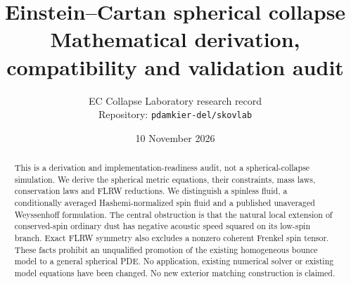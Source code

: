 \documentclass[11pt,a4paper]{article}
\title{Einstein--Cartan spherical collapse\\Mathematical derivation, compatibility and validation audit}
\author{EC Collapse Laboratory research record\\\small Repository: \texttt{pdamkier-del/skovlab}}
\date{10 November 2026}
\begin{document}
\maketitle
\begin{abstract}
This is a derivation and implementation-readiness audit, not a spherical-collapse simulation. We derive the spherical metric equations, their constraints, mass laws, conservation laws and FLRW reductions. We distinguish a spinless fluid, a conditionally averaged Hashemi-normalized spin fluid and a published unaveraged Weyssenhoff formulation. The central obstruction is that the natural local extension of conserved-spin ordinary dust has negative acoustic speed squared on its low-spin branch. Exact FLRW symmetry also excludes a nonzero coherent Frenkel spin tensor. These facts prohibit an unqualified promotion of the existing homogeneous bounce model to a general spherical PDE. No application, existing numerical solver or existing model equations have been changed. No new exterior matching construction is claimed.
\end{abstract}
\tableofcontents






\end{document}
